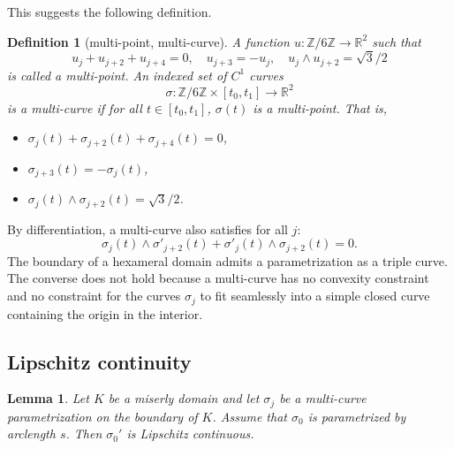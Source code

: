 \documentclass[11pt]{amsart}
\newtheorem{definition}[equation]{Definition}
\newtheorem{lemma}[equation]{Lemma}
\newcommand{\ring}[1]{\mathbb{#1}}
\def\rZ{{\ring{Z}}}
\begin{document}
This suggests the following definition.

\begin{definition}[multi-point, multi-curve]
A function $u:\rZ/6\rZ\to\ring{R}^2$ such that 
  \begin{equation}\label{eqn:uA}
  u_j+u_{j+2}+u_{j+4} = 0,\quad u_{j+3} = -u_j,\quad  {u_j}\land{u_{j+2}}=\sqrt{3}/2
  \end{equation}
is called a {\it multi-point}. 
An indexed set of $C^1$ curves
$$\sigma:\ring{Z}/6\ring{Z} \times [t_0,t_1]\to \ring{R}^2$$ 
is a {\it  multi-curve} if for all $t\in[t_0,t_1]$, $\sigma(t)$ is a multi-point.
That is,
\begin{itemize}
\item $\sigma_j(t) + \sigma_{j+2}(t) + \sigma_{j+4}(t) = 0$,
\item $\sigma_{j+3}(t) = -\sigma_j(t)$,
\item ${\sigma_j(t)}\land{\sigma_{j+2}(t)}=\sqrt{3}/2$.
\end{itemize}
\end{definition}



By differentiation, a multi-curve also satisfies for all $j$:
\begin{equation}\label{eqn:sigma'}
{\sigma_j(t)}\land{\sigma'_{j+2}(t)} 
+ {\sigma'_j(t)}\land{\sigma_{j+2}(t)} = 0.
\end{equation}
The boundary of a hexameral domain admits a parametrization as a
triple curve.  The converse does not hold because a multi-curve has no
convexity constraint and no constraint for the curves $\sigma_j$ to
fit seamlessly into a simple closed curve containing the origin in the
interior.


\subsection{Lipschitz continuity}

\begin{lemma}\label{lemma:s0:lip}
  Let $K$ be a miserly domain and let $\sigma_j$ be a multi-curve
  parametrization on the boundary of $K$.  Assume that $\sigma_0$ is
  parametrized by arclength $s$.  Then $\sigma_0'$ is Lipschitz
  continuous.
\end{lemma}
\end{document}
